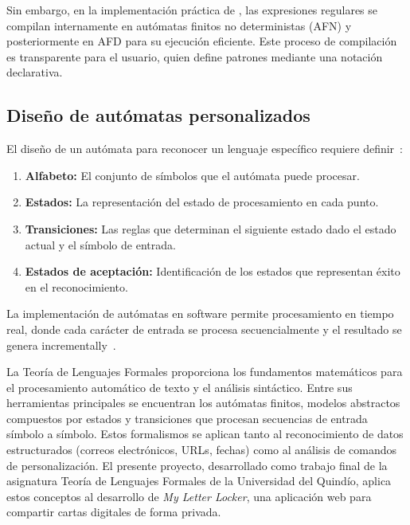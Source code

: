 \documentclass[12pt,letterpaper]{article}
\begin{document}
Sin embargo, en la implementación práctica de \textcite{thompson1968programming}, las expresiones regulares se compilan internamente en autómatas finitos no deterministas (AFN) y posteriormente en AFD para su ejecución eficiente. Este proceso de compilación es transparente para el usuario, quien define patrones mediante una notación declarativa.

\subsection{Diseño de autómatas personalizados}
El diseño de un autómata para reconocer un lenguaje específico requiere definir~\cite{kelley1995automata}:

\begin{enumerate}
    \item \textbf{Alfabeto:} El conjunto de símbolos que el autómata puede procesar.
    \item \textbf{Estados:} La representación del estado de procesamiento en cada punto.
    \item \textbf{Transiciones:} Las reglas que determinan el siguiente estado dado el estado actual y el símbolo de entrada.
    \item \textbf{Estados de aceptación:} Identificación de los estados que representan éxito en el reconocimiento.
\end{enumerate}

La implementación de autómatas en software permite procesamiento en tiempo real, donde cada carácter de entrada se procesa secuencialmente y el resultado se genera incrementally~\cite{gusfield1997algorithms}.


\noindent La Teoría de Lenguajes Formales proporciona los fundamentos matemáticos para el procesamiento automático de texto y el análisis sintáctico. Entre sus herramientas principales se encuentran los autómatas finitos, modelos abstractos compuestos por estados y transiciones que procesan secuencias de entrada símbolo a símbolo. Estos formalismos se aplican tanto al reconocimiento de datos estructurados (correos electrónicos, URLs, fechas) como al análisis de comandos de personalización.
El presente proyecto, desarrollado como trabajo final de la asignatura Teoría de Lenguajes Formales de la Universidad del Quindío, aplica estos conceptos al desarrollo de \emph{My Letter Locker}, una aplicación web para compartir cartas digitales de forma privada.
\end{document}
